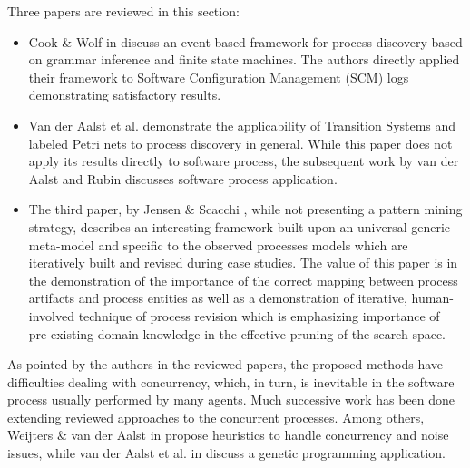 Three papers are reviewed in this section: 
\begin{itemize}
	\item Cook \& Wolf in \cite{citeulike:328044} discuss an event-based framework for process discovery based on grammar inference and finite state machines. The authors directly applied their framework to Software Configuration Management (SCM) logs demonstrating satisfactory results. 
	\item Van der Aalst et al. \cite{citeulike:3718014} demonstrate the applicability of Transition Systems and labeled Petri nets to process discovery in general. While this paper does not apply its results directly to software process, the subsequent work by van der Aalst and Rubin \cite{citeulike:1885717} discusses software process application.
	\item The third paper, by Jensen \& Scacchi \cite{citeulike:5043664}, while not presenting a pattern mining strategy, describes an interesting framework built upon an universal generic meta-model and specific to the observed processes models which are iteratively built and revised during case studies. The value of this paper is in the demonstration of the importance of the correct mapping between process artifacts and process entities as well as a demonstration of iterative, human-involved technique of process revision which is emphasizing importance of pre-existing domain knowledge in the effective pruning of the search space.
\end{itemize}
As pointed by the authors in the reviewed papers, the proposed methods have difficulties dealing with concurrency, which, in turn, is inevitable in the software process usually performed by many agents. Much successive work has been done extending reviewed approaches to the concurrent processes. Among others, Weijters \& van der Aalst in \cite{citeulike:5128101} propose heuristics to handle concurrency and noise issues, while van der Aalst et al. in \cite{citeulike:5128110} discuss a genetic programming application. 
